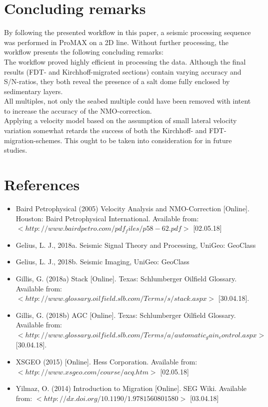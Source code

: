 \documentclass[10pt,a4paper]{article}
\begin{document}
\section{Concluding remarks}
By following the presented workflow in this paper, a seismic processing sequence was performed in ProMAX on a 2D line. Without further processing, the workflow presents the following concluding remarks: 
\\
The workflow proved highly efficient in processing the data. Although the final results (FDT- and Kirchhoff-migrated sections) contain varying accuracy and S/N-ratios, they both reveal the presence of a salt dome fully enclosed by sedimentary layers. 
\\
All multiples, not only the seabed multiple could have been removed with intent to increase the accuracy of the NMO-correction.
\\
Applying a velocity model based on the assumption of small lateral velocity variation somewhat retards the success of both the Kirchhoff- and FDT-migration-schemes. This ought to be taken into consideration for in future studies. 

\newpage

\section{References}

\begin{itemize}
    \item Baird Petrophysical (2005) Velocity Analysis and NMO-Correction [Online]. Houston: Baird Petrophysical International. Available from: $<http://www.bairdpetro.com/pdf_files/p58-62.pdf>$ [02.05.18]
    \item Gelius, L. J., 2018a. Seismic Signal Theory and Processing, UniGeo: GeoClass 
    \item Gelius, L. J., 2018b. Seismic Imaging, UniGeo: GeoClass
    \item Gillis, G. (2018a) Stack [Online]. Texas: Schlumberger Oilfield Glossary. Available from: $<http://www.glossary.oilfield.slb.com/Terms/s/stack.aspx>$ [30.04.18].
    \item Gillis, G. (2018b) AGC [Online]. Texas: Schlumberger Oilfield Glossary. Available from: $<http://www.glossary.oilfield.slb.com/Terms/a/automatic_gain_control.aspx>$ [30.04.18].
    \item XSGEO (2015) [Online]. Hess Corporation. Available from: $<http://www.xsgeo.com/course/acq.htm>$ [02.05.18]
    \item Yilmaz, O. (2014) Introduction to Migration [Online]. SEG Wiki. Available from: $<http://dx.doi.org/10.1190/1.9781560801580>$ [03.04.18]
\end{itemize}
\end{document}
